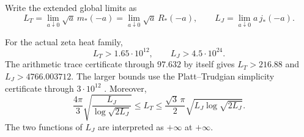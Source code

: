 Write the extended global limits as
\[
 L_T=\lim_{a\downarrow0}\sqrt a\,m_*(-a)
     =\lim_{a\downarrow0}\sqrt a\,R_*(-a),\qquad
 L_J=\lim_{a\downarrow0}a\,j_*(-a).
\]

\begin{corollary}
\label{cor:fd-global-growth-numeric}
For the actual zeta heat family,
\[
 L_T>1.65\cdot10^{12},\qquad L_J>4.5\cdot10^{24}.
\]
The arithmetic trace certificate through $97.632$ by itself gives
$L_T>216.88$ and $L_J>4766.003712$. The larger bounds use the
Platt--Trudgian simplicity certificate through $3\cdot10^{12}$
\cite[abstract, p.~792; preprint Section~2, pp.~2--3]{platt-trudgian2021}.
Moreover,
\[
 \frac{4\pi}{3}
     \sqrt{\frac{L_J}{\log\sqrt{2L_J}}}
 \le L_T\le
 \frac{\sqrt3\,\pi}{2}
     \sqrt{L_J\log\sqrt{2L_J}}.
\]
The two functions of \(L_J\) are interpreted as \(+\infty\) at
\(+\infty\).
\end{corollary}
